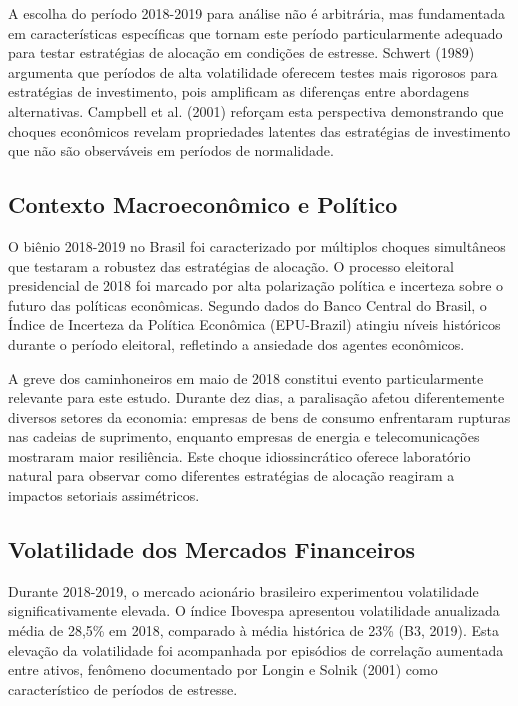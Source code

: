A escolha do período 2018-2019 para análise não é arbitrária, mas fundamentada em características específicas que tornam este período particularmente adequado para testar estratégias de alocação em condições de estresse. Schwert (1989) argumenta que períodos de alta volatilidade oferecem testes mais rigorosos para estratégias de investimento, pois amplificam as diferenças entre abordagens alternativas. Campbell et al. (2001) reforçam esta perspectiva demonstrando que choques econômicos revelam propriedades latentes das estratégias de investimento que não são observáveis em períodos de normalidade.

\subsection{Contexto Macroeconômico e Político}

O biênio 2018-2019 no Brasil foi caracterizado por múltiplos choques simultâneos que testaram a robustez das estratégias de alocação. O processo eleitoral presidencial de 2018 foi marcado por alta polarização política e incerteza sobre o futuro das políticas econômicas. Segundo dados do Banco Central do Brasil, o Índice de Incerteza da Política Econômica (EPU-Brazil) atingiu níveis históricos durante o período eleitoral, refletindo a ansiedade dos agentes econômicos.

A greve dos caminhoneiros em maio de 2018 constitui evento particularmente relevante para este estudo. Durante dez dias, a paralisação afetou diferentemente diversos setores da economia: empresas de bens de consumo enfrentaram rupturas nas cadeias de suprimento, enquanto empresas de energia e telecomunicações mostraram maior resiliência. Este choque idiossincrático oferece laboratório natural para observar como diferentes estratégias de alocação reagiram a impactos setoriais assimétricos.

\subsection{Volatilidade dos Mercados Financeiros}

Durante 2018-2019, o mercado acionário brasileiro experimentou volatilidade significativamente elevada. O índice Ibovespa apresentou volatilidade anualizada média de 28,5\% em 2018, comparado à média histórica de 23\% (B3, 2019). Esta elevação da volatilidade foi acompanhada por episódios de correlação aumentada entre ativos, fenômeno documentado por Longin e Solnik (2001) como característico de períodos de estresse.

